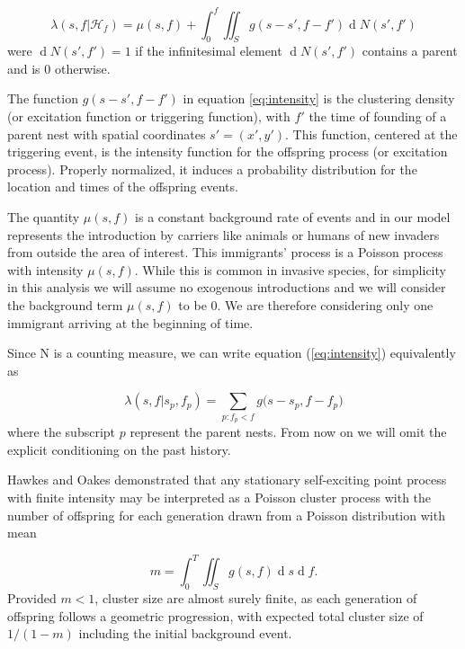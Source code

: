 \documentclass{article}
\renewcommand{\d}[1]{\ensuremath{\operatorname{d}\!{#1}}}
\begin{document}
\begin{equation}\label{eq:intensity}
    \lambda(s, f | \mathcal{H}_f) = \mu(s, f) + \int_{0}^{f} \iint_{S} g(s - s', f - f') \d N(s', f')
\end{equation}
were $\d N(s', f') = 1$ if the infinitesimal element $\d N(s', f')$ contains a parent and is 0 otherwise. 

The function $g(s - s', f - f')$ in equation \ref{eq:intensity} is the clustering density (or excitation function or triggering function), with $f'$ the time of founding of a parent nest with spatial coordinates $s' = (x', y')$. This function, centered at the triggering event, is the intensity function for the offspring process (or excitation process). Properly normalized, it induces a probability distribution for the location and times of the offspring events.

The quantity $\mu(s, f)$ is a constant background rate of events and in our model represents the introduction by carriers like animals or humans of new invaders from outside the area of interest. This immigrants' process is a Poisson process with intensity $\mu(s, f)$. While this is common in invasive species, for simplicity in this analysis we will assume no exogenous introductions and we will consider the background term $\mu(s, f) $ to be 0. We are therefore considering only one immigrant arriving at the beginning of time. 

Since N is a counting measure, we can write equation (\ref{eq:intensity}) equivalently as

\begin{equation*}
    \lambda(s, f | s_p, f_p) = \sum_{ p: f_p < f } g \Big(s - s_p, f - f_p \Big)
\end{equation*}
where the subscript $p$ represent the parent nests. From now on we will omit the explicit conditioning on the past history.

Hawkes and Oakes \cite{Hawkes74} demonstrated that any stationary self-exciting point process with finite intensity may be interpreted as a Poisson cluster process with the number of offspring for each generation drawn from a Poisson distribution with mean 

\begin{equation} \label{eq:NumOffsp}
    m = \int_0^{T} \iint_S g(s, f)\d s \d f.
\end{equation}
Provided $m < 1$, cluster size are almost surely finite, as each generation of offspring follows a geometric progression, with expected total cluster size of $1/(1 - m)$ including the initial background event.
\end{document}
